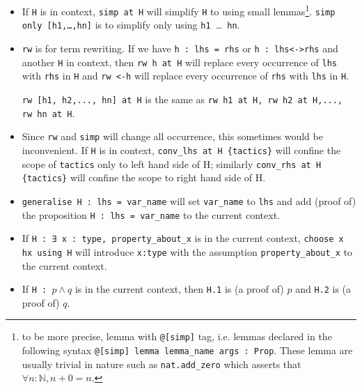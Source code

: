\documentclass{report}
\theoremstyle{definition}
\theoremstyle{plain}
\begin{document}
\begin{itemize}
\begin{itemize}
    {\tt replace H : some\_proposition} will add one more goal of proving {\tt some\_proposition} and then replace {\tt H} to the proposition proven.
    \item If {\tt H} is in context, {\tt simp at H} will simplify {\tt H} to using small lemmas\footnote{to be more precise, lemma with {\tt @[simp]} tag, i.e. lemmas declared in the following syntax {\tt @[simp] lemma lemma\_name args : Prop}. These lemma are usually trivial in nature such as {\tt nat.add\_zero} which asserts that $\forall n:\mathbb N, n + 0 = n$.}.
    {\tt simp only [h1,\dots,hn]} is to simplify only using {\tt h1 }\dots{\tt{ hn}}.
    \item {\tt rw} is for term rewriting. If we have {\tt h : lhs = rhs} or {\tt h : lhs<->rhs} and another {\tt H} in context, then {\tt rw h at H} will replace every occurrence of {\tt lhs} with {\tt rhs} in {\tt H} and {\tt rw <-h} will replace every occurrence of {\tt rhs} with {\tt lhs} in {\tt H}.
  
    {\tt rw [h1, h2,..., hn] at H} is the same as {\tt rw h1 at H, rw h2 at H,..., rw hn at H}.
    
    \item Since {\tt rw} and {\tt simp} will change all occurrence, this sometimes would be inconvenient. If {\tt H} is in context, {\tt conv\_lhs at H \{tactics\}} will confine the scope of {\tt tactics} only to left hand side of H; similarly {\tt conv\_rhs at H \{tactics\}} will confine the scope to right hand side of H.

    \item {\tt generalise H : lhs = var\_name} will set {\tt var\_name} to {\tt lhs} and add (proof of) the proposition {\tt H : lhs = var\_name} to the current context.
    \item If {\tt H : ∃ x : type, property\_about\_x} is in the current context, {\tt choose x hx using H} will introduce {\tt x:type} with the assumption {\tt property\_about\_x} to the current context. 
    \item If {\tt H : $p\land q$} is in the current context, then {\tt H.1} is (a proof of) $p$ and {\tt H.2} is (a proof of) $q$.
  \end{itemize}


\end{itemize}
\end{document}
